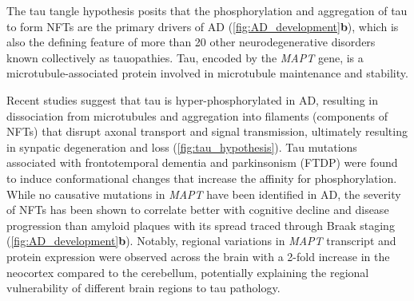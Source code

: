 \newpage
{} 
The tau tangle hypothesis posits that the phosphorylation and aggregation of tau to form NFTs are the primary drivers of AD\cite{KS1986} (\cref{fig:AD_development}\textbf{b}), which is also the defining feature of more than 20 other neurodegenerative disorders known collectively as tauopathies\cite{Orr2017}. Tau, encoded by the \textit{MAPT} gene, is a microtubule-associated protein involved in microtubule maintenance and stability. 

Recent studies suggest that tau is hyper-phosphorylated in AD, resulting in dissociation from microtubules and aggregation into filaments\cite{Grundke-Iqbal1986,Grundke-Iqbal1986a} (components of NFTs) that disrupt axonal transport and signal transmission, ultimately resulting in synpatic degeneration and loss\cite{Coomans2021} (\cref{fig:tau_hypothesis}). Tau mutations associated with frontotemporal dementia and parkinsonism (FTDP)  were found to induce conformational changes that increase the affinity for phosphorylation\cite{Alonso2004}. While no causative mutations in \textit{MAPT} have been identified in AD, the severity of NFTs has been shown to correlate better with cognitive decline and disease progression than amyloid plaques \cite{Serrano-Pozo2016,Giannakopoulos2003,PV1992} with its spread traced through Braak staging \cite{H1991} (\cref{fig:AD_development}\textbf{b}). Notably, regional variations in \textit{MAPT} transcript and protein expression were observed across the brain with a 2-fold increase in the neocortex compared to the cerebellum, potentially explaining the regional vulnerability of different brain regions to tau pathology\cite{Trabzuni2012}. 

